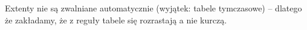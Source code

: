 \documentclass[12pt]{article}
\begin{document}
Extenty nie są zwalniane automatycznie (wyjątek: tabele tymczasowe) -- dlatego
że zakładamy, że z reguły tabele się rozrastają a nie kurczą.


\begin{comment}

Cluster
	* Przechowywanie dwoch (lub wiecej) tabel lacznie na poziomie fizycznym (razem)
		- jesli najczestszym sposobem ich przegladania jest join
		- mozna stworzyc strukture typu cluster
	* ORACLE:
		CREATE TABLE dept (bla bla)
		CLUSTER emp_dept(deptno);
	
Fragmentacja tabel
	* dystrybujcja dany z jednej tabeli pomiedzy wiele dbspace'ow)
 	* INFORMIX:
	FRAGMENT BY ROUND ROBIN (bez konkretnego pomyslu)
		IN dbspace1, dbspace2, dbspace3
	FRAGMENT BY EXPRESSION
		employee_num <= 2500 IN dbspace1,
		employee_num > 2500 IN dbspace2,
		etc.	
	
	* ORACLE:
	PARTITION BY RANGE (week_no)
		(PARTITION sales1 VALUES LESS THAN (4) TABLESPACE ts1)

Podsumowanie
	* Dazymy do tego zeby tabele byly przechowywane w ciaglych obszarach na dysku
		- w ogolnym przypadku - trudne
		- pewnym rozwiazaniem jest pamietanie danych w ciaglych extentach
		- warto czasem zreorganizowac strukture extentow aby uzyskac ciagly obszar
		
	* Czasami sens ma partycjonowanie/fragmentacja danych
		- zrownoleglanie operacji we/wy
		- zysk w przypadku wielu malych transakcji
		- zysk w przypadku dlugich operacji
		
	* W pewnych przypadkach sens ma tworzenie struktur typu cluster
		- gdy wiekszosc operacji dla tych tabel operacje pobierania danych to JOIN
		- tabele nie sa przegladane samodzielnie ('podatek')
	
Indeksy
	* Indeksy plaskie
		- uporzadkowane zbiory indeksujace
	* Indeksy bazujace na B-drzewach
	* Indeksy - struktury typu hash
	* Indeksowanie po kilku atrybutach
	* Pojecie ogolne
		- Moze to byc plik plaski, struktura drzewiasta, hash
	* Moze byc uzywany na dwa sposoby
		- W celu uzyskania dostepu o charakterze bezposrednim
		- W celu uzyskania dostepu sekwencyjnego (dostep zgodny z porzadkiem wyznaczonym przez przez indeks)
	* Indeksowanie jest uzywane zeby przyspieszyc dostep
	* Klucz (search key) - atrybut/zbior atrybiutow wg ktorego wyszukujemy
	* Zbior indeksujacy - rekordy postacji search-key<-->pointer
	* Indeks jest mniejszy od zbioru ktory podlega indeksowaniu
	* Dwa podstawowe typy indeksow
		* uporzadkowane - klucze sa uporzadkowane
		* hash - klucze sa rozmieszczone rownomiernie (zgodnie z funkcja haszujaca)
		

\end{comment}
\end{document}
